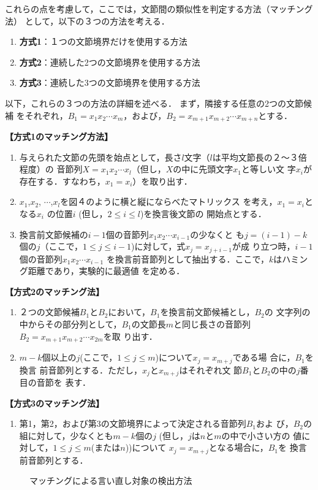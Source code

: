 これらの点を考慮して，ここでは，文節間の類似性を判定する方法（マッチング法）
として，以下の３つの方法を考える．
\newpage
\begin{enumerate}
\item {\bf 方式1}：１つの文節境界だけを使用する方法
\item {\bf 方式2}：連続した2つの文節境界を使用する方法
\item {\bf 方式3}：連続した3つの文節境界を使用する方法
\end{enumerate}
\Vspace

以下，これらの３つの方法の詳細を述べる．  まず，隣接する任意の2つの文節候補
をそれぞれ，$B_1 = x_1x_2 \cdots x_m$，および，$B_2 = x_{m+1}x_{m+2}\cdots
x_{m+n}$とする．
\bigskip

{\bf 【方式1のマッチング方法】}
\Vspace
\begin{enumerate}
\item 与えられた文節の先頭を始点として，長さ$l$文字（$l$は平均文節長の２〜３倍
程度）の\break
音節列$X=x_1 x_2 \cdots x_l$（但し，$X$の中に先頭文字$x_1$と等しい文
字$x_i$が存在する．すなわち，$x_1=x_i$）を取り出す．
\item $x_1$,$x_2$, $\cdots$,$x_l$を図４のように横と縦にならべたマトリックス
を考え，$x_1=x_i$となる$x_i$\break
の位置$i$ (但し，$2 \le i \le l$)を換言後文節の
開始点とする．
\item 換言前文節候補の$i-1$個の音節列$x_1x_2 \cdots x_{i-1}$の少なくと
も$j=(i-1)-k$個の$j$（ここで，$1 \le j \le i-1$)に対して，式$x_j=x_{j+i-1}$が成
り立つ時，$i-1$個の音節列$x_1x_2 \cdots x_{i-1}$
を換言前音節列として抽出する．ここで，$k$はハミング距離であり，実験的に最適値
を定める．
\end{enumerate}

\bigskip

{\bf 【方式2のマッチング法】}
\Vspace
\begin{enumerate}
\item ２つの文節候補$B_1$と$B_2$において，$B_1$を換言前文節候補とし，$B_2$の
文字列の中からその部分列として，$B_1$の文節長$m$と同じ長さの音節列$B_2 =
x_{m+1}x_{m+2} \cdots x_{2m}$を取\break
り出す．
\item $m-k$個以上の$j$(ここで，$ 1 \le j \le m$)について$x_j = x_{m+j}$である場
合に，$B_1$を換言\break
前音節列とする．ただし，$x_j$と$x_{m+j}$はそれぞれ文
節$B_1$と$B_2$の中の$j$番目の音節を\break
表す．
\end{enumerate}

\bigskip

{\bf 【方式3のマッチング法】}
\Vspace
\begin{enumerate}
\item[~] 第1，第2，および第3の文節境界によって決定される音節列$B_1$およ
び，$B_2$の組に対して，少なくとも$m-k$個の$j$ (但し，$j$は$n$と$m$の中で小さい方の
値に対して，$ 1 \le j \le m$(または$n$))について $x_j = x_{m+j}$となる場合に，$B_1$を
換言前音節列とする．
\end{enumerate}
\begin{figure}[htbp]
  \begin{center}
    \medskip
    \caption{マッチングによる言い直し対象の検出方法}
    \label{fig:4}
  \end{center}
\end{figure}
